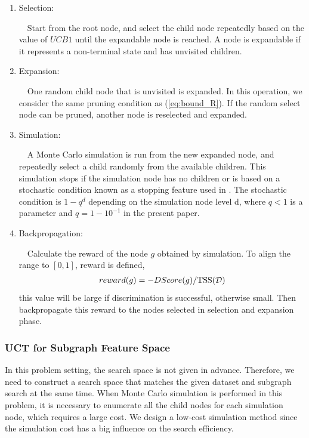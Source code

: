 \begin{enumerate}
	\item{Selection}:

	~~Start from the root node, and select the child node repeatedly 
	based on the value of $UCB1$ until the expandable node is reached.
	A node is expandable if it represents a non-terminal state and has unvisited children.

	\item{Expansion}:

	~~One random child node that is unvisited is expanded.
	In this operation, we consider the same pruning condition as (\ref{eq:bound_R}). 
	If the random select node can be pruned, another node is reselected and expanded.

	\item{Simulation}:
	
	~~A Monte Carlo simulation is run from the new expanded node,
	and repeatedly select a child randomly from the available children.
	This simulation stops if the simulation node has no children or 
	is based on a stochastic condition known as a stopping feature used in \cite{Romaric:2010}.
	The stochastic condition is $1 - q^{d}$ depending on the simulation node level d,
	where $q < 1$ is a parameter and $q = 1 - 10^{-1}$ in the present paper.
	
	\item{Backpropagation}:

	~~Calculate the reward of the node $g$ obtained by simulation.
	To align the range to $[0, 1]$, reward is defined, 
	\begin{eqnarray}
		reward(g) = -DScore(g) / \mathrm{TSS}(\mathcal{D})
	\end{eqnarray}
	this value will be large if discrimination is successful, otherwise small.
	Then backpropagate this reward to the nodes selected in selection and expansion phase.
\end{enumerate}

\subsubsection*{UCT for Subgraph Feature Space}
In this problem setting, the search space is not given in advance.
Therefore, we need to construct a search space that matches the given dataset 
and subgraph search at the same time.
When Monte Carlo simulation is performed in this problem, 
it is necessary to enumerate all the child nodes for each simulation node, which requires a large cost.
We design a low-cost simulation method 
since the simulation cost has a big influence on the search efficiency.

